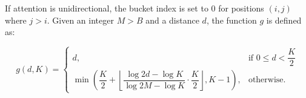 \noindent If attention is unidirectional, the bucket index is set to $0$ for positions $(i, j)$ where $j > i$. Given an integer $M > B$ and a distance $d$, the function $g$ is defined as:

\begin{equation}
    g(d, K) = 
    \begin{cases}
        d, & \text{if } 0 \leq d < \dfrac{K}{2} \\
        \min \left(\dfrac{K}{2} + \left\lfloor \dfrac{\log 2d - \log K}{\log 2M - \log K} \cdot \dfrac{K}{2}\right\rfloor, K-1 \right), & \text{otherwise.}
    \end{cases}
\end{equation}








